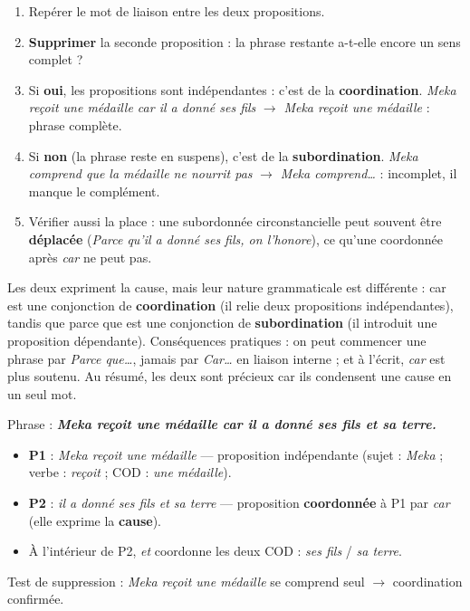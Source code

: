 \documentclass[11pt]{article}
\newcommand{\cle}[1]{{\popxbold\color{popdark}#1}}
\begin{document}
\begin{methode}
\begin{enumerate}
\item Repérer le mot de liaison entre les deux propositions.
\item \textbf{Supprimer} la seconde proposition : la phrase restante a-t-elle encore un sens complet ?
\item Si \textbf{oui}, les propositions sont indépendantes : c'est de la \textbf{coordination}. \emph{Meka reçoit une médaille car il a donné ses fils} $\rightarrow$ \emph{Meka reçoit une médaille} : phrase complète.
\item Si \textbf{non} (la phrase reste en suspens), c'est de la \textbf{subordination}. \emph{Meka comprend que la médaille ne nourrit pas} $\rightarrow$ \emph{Meka comprend\ldots} : incomplet, il manque le complément.
\item Vérifier aussi la place : une subordonnée circonstancielle peut souvent être \textbf{déplacée} (\emph{Parce qu'il a donné ses fils, on l'honore}), ce qu'une coordonnée après \emph{car} ne peut pas.
\end{enumerate}
\end{methode}

\begin{attention}
Les deux expriment la cause, mais leur nature grammaticale est différente : \cle{car} est une conjonction de \textbf{coordination} (il relie deux propositions indépendantes), tandis que \cle{parce que} est une conjonction de \textbf{subordination} (il introduit une proposition dépendante). Conséquences pratiques : on peut commencer une phrase par \emph{Parce que\ldots}, jamais par \emph{Car\ldots} en liaison interne ; et à l'écrit, \emph{car} est plus soutenu. Au résumé, les deux sont précieux car ils condensent une cause en un seul mot.
\end{attention}

\begin{exemplebox}
Phrase : \emph{\textbf{Meka reçoit une médaille car il a donné ses fils et sa terre.}}
\begin{itemize}
\item \textbf{P1} : \emph{Meka reçoit une médaille} — proposition indépendante (sujet : \emph{Meka} ; verbe : \emph{reçoit} ; COD : \emph{une médaille}).
\item \textbf{P2} : \emph{il a donné ses fils et sa terre} — proposition \textbf{coordonnée} à P1 par \emph{car} (elle exprime la \textbf{cause}).
\item À l'intérieur de P2, \emph{et} coordonne les deux COD : \emph{ses fils} / \emph{sa terre}.
\end{itemize}
Test de suppression : \emph{Meka reçoit une médaille} se comprend seul $\rightarrow$ coordination confirmée.
\end{exemplebox}
\end{document}
